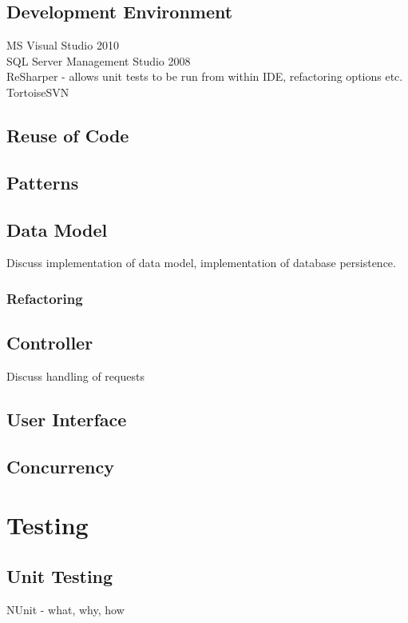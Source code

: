 \documentclass{l4proj}
\begin{document}
\section{Development Environment}
MS Visual Studio 2010\\
SQL Server Management Studio 2008\\
ReSharper - allows unit tests to be run from within IDE, refactoring options etc.\\
TortoiseSVN

\section{Reuse of Code}

\section{Patterns}

\section{Data Model}
Discuss implementation of data model, implementation of database persistence.

\subsection{Refactoring}

\section{Controller}
Discuss handling of requests

\section{User Interface}

\section{Concurrency}


\chapter{Testing}
\label{testing}

\section{Unit Testing}
NUnit - what, why, how
\end{document}
